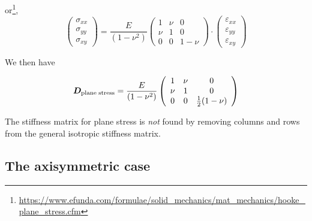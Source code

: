 or\footnote{\url{https://www.efunda.com/formulae/solid_mechanics/mat_mechanics/hooke_plane_stress.cfm}}, 
\begin{equation}
\left(
\begin{array}{c}
\sigma_{xx}\\
\sigma_{yy}\\
\sigma_{xy}
\end{array}
\right)
=\frac{E}{(1-\nu^2)}
\left(
\begin{array}{ccc}
1 & \nu & 0 \\
\nu & 1 & 0 \\
0 &0 &1-\nu
\end{array}
\right)
\cdot
\left(
\begin{array}{c}
\varepsilon_{xx}\\
\varepsilon_{yy}\\
\varepsilon_{xy}
\end{array}
\right)
\end{equation}


We then have
\begin{mdframed}[backgroundcolor=blue!5]
\begin{equation}
{\bm D}_{\rm plane \; stress} = 
\frac{E}{(1-\nu^2)}
\left(
\begin{array}{ccc}
1 & \nu & 0 \\
\nu & 1 & 0 \\
0 &0 &\frac12(1-\nu)
\end{array}
\right)
\end{equation}
\end{mdframed}

\begin{remark}
The stiffness matrix for plane stress is {\it not} found by removing columns and rows from the general isotropic stiffness matrix. 
\end{remark}



\subsection{The axisymmetric case} \label{ss:fem_elast_axissymm}

